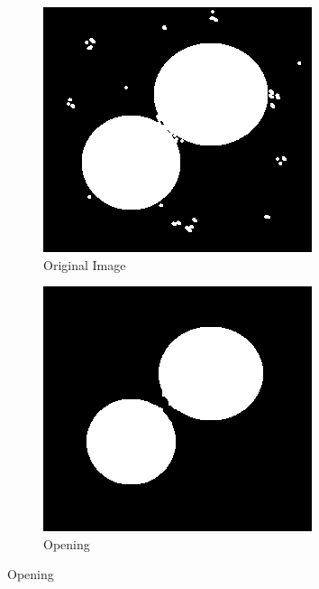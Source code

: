 \begin{figure}[h]
    \centering
    \begin{subfigure}{0.33\textwidth}
        \centering
        \includegraphics[width=.9\linewidth]{images/literature/dots}
        \caption{Original Image}
    \end{subfigure}%
    \begin{subfigure}{.33\textwidth}
        \centering
        \includegraphics[width=.9\linewidth]{images/literature/opening}
        \caption{Opening}
    \end{subfigure}%

\end{figure}

